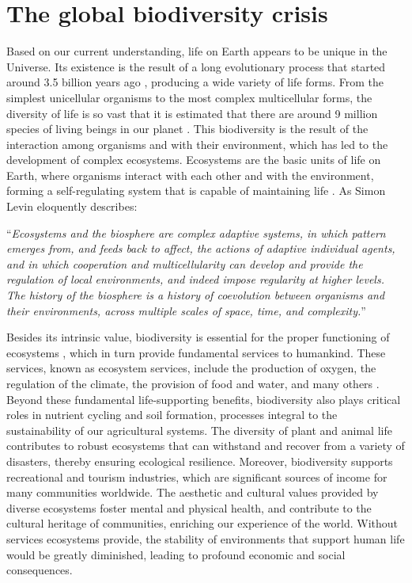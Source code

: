 \setcounter{page}{0}

\section{\label{sec:The global biodiversity crisis} The global biodiversity
  crisis}

Based on our current understanding, life on Earth appears to be unique in the
Universe. Its existence is the result of a long evolutionary process that
started around 3.5 billion years ago \cite{Taylor_1993,Schopf2006},
producing a wide variety of life forms. From the simplest unicellular organisms
to the most complex multicellular forms, the diversity of life is so vast that
it is estimated that there are around 9 million species of living beings in our
planet \cite{Cardinale2012}. This biodiversity is the result of the interaction
among organisms and with their environment, which has led to the development of
complex ecosystems. Ecosystems are the basic units of life on Earth, where
organisms interact with each other and with the environment, forming a
self-regulating system that is capable of maintaining life \cite{Levin2005}.
As Simon Levin eloquently describes:

\begin{displayquote}
  ``\textit{Ecosystems and the biosphere are complex adaptive systems, in which
    pattern
    emerges from, and feeds back to affect, the actions of adaptive individual
    agents, and in which cooperation and multicellularity can develop and
    provide
    the regulation of local environments, and indeed impose regularity at
    higher
    levels. The history of the biosphere is a history of coevolution between
    organisms and their environments, across multiple scales of space, time,
    and
    complexity.}''
\end{displayquote}

Besides its intrinsic value, biodiversity is essential for the proper
functioning of ecosystems \cite{Gamfeldt2008}, which in turn provide
fundamental services to humankind. These services, known as ecosystem services,
include the production of oxygen, the regulation of the climate, the provision
of food and water, and many others \cite{Daily1997}. Beyond these fundamental
life-supporting benefits, biodiversity also plays critical roles in nutrient
cycling and soil formation, processes integral to the sustainability of our
agricultural systems. The diversity of plant and animal life contributes to
robust ecosystems that can withstand and recover from a variety of disasters,
thereby ensuring ecological resilience. Moreover, biodiversity supports
recreational and tourism industries, which are significant sources of income
for many communities worldwide. The aesthetic and cultural values provided by
diverse ecosystems foster mental and physical health, and contribute to the
cultural heritage of communities, enriching our experience of the world.
Without services ecosystems provide, the stability of environments that support
human life would be greatly diminished, leading to profound economic and social
consequences.

